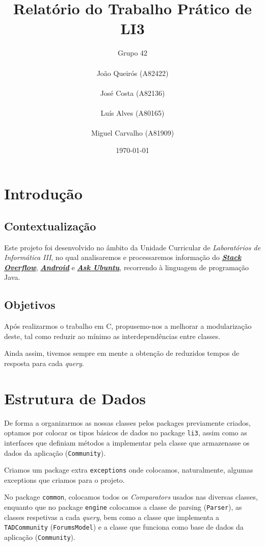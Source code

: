 \documentclass[a4paper]{article}
\begin{document}
\title{Relatório do Trabalho Prático de LI3}
\author{Grupo 42\\
\\
João Queirós (A82422)\\
\\
José Costa (A82136)\\
\\
Luís Alves (A80165)\\
\\
Miguel Carvalho (A81909)}
\date{\today}

\maketitle
\tableofcontents

\section{Introdução}

	\subsection{Contextualização}
		\tab Este projeto foi desenvolvido no âmbito da Unidade Curricular
		de \textit{Laboratórios de Informática III}, no qual analisaremos e processaremos
		informação do \href{https://pt.stackoverflow.com}{\textit{\textbf{Stack Overflow}}},
		\href{https://android.stackexchange.com}{\textit{\textbf{Android}}} e
		\href{https://askubuntu.com}{\textit{\textbf{Ask Ubuntu}}}, recorrendo
		à linguagem de programação Java.


	\subsection{Objetivos}
		\tab Após realizarmos o trabalho em C, propusemo-nos a melhorar a modularização
		deste, tal como reduzir ao mínimo as interdependências entre classes.
		\par Ainda assim, tivemos sempre em mente a obtenção de reduzidos tempos de resposta
		para cada \textit{query}.

\section{Estrutura de Dados}
	\tab De forma a organizarmos as nossas classes pelos packages previamente criados,
	optamos por colocar os tipos básicos de dados no package \texttt{li3}, assim como
	as interfaces que definiam métodos a implementar pela classe que armazenasse os
	dados da aplicação (\texttt{Community}).
	\par Criamos um package extra \texttt{exceptions} onde colocamos, naturalmente,
	algumas exceptions que criamos para o projeto.
	\par No package \texttt{common}, colocamos todos os \textit{Comparators} usados
	nas diversas classes, enquanto que no package \texttt{engine} colocamos a classe
	de parsing (\texttt{Parser}), as classes respetivas a cada \textit{query}, bem como a
	classe que implementa a \texttt{TADCommunity} (\texttt{ForumsModel}) e a classe
	que funciona como base de dados da aplicação (\texttt{Community}).
\end{document}

